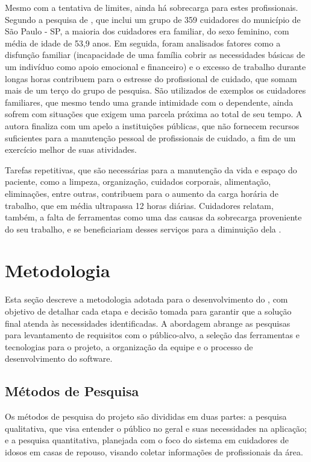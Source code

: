 \documentclass[
	article,			%
	12pt,				%
	oneside,			%
	a4paper,			%
    BIBLATEX,           %
	english,			%
	brazil,				%
	sumario=tradicional
	]{abntex2}
\begin{document}
Mesmo com a tentativa de limites, ainda há sobrecarga para estes profissionais. Segundo a pesquisa de , que inclui um grupo de 359 cuidadores do município de São Paulo - SP, a maioria dos cuidadores era familiar, do sexo feminino, com média de idade de 53,9 anos. Em seguida, foram analisados fatores como a disfunção familiar (incapacidade de uma família cobrir as necessidades básicas de um indivíduo como apoio emocional e financeiro) e o excesso de trabalho durante longas horas contribuem para o estresse do profissional de cuidado, que somam mais de um terço do grupo de pesquisa. São utilizados de exemplos os cuidadores familiares, que mesmo tendo uma grande intimidade com o dependente, ainda sofrem com situações que exigem uma parcela próxima ao total de seu tempo. A autora finaliza com um apelo a instituições públicas, que não fornecem recursos suficientes para a manutenção pessoal de profissionais de cuidado, a fim de um exercício melhor de suas atividades.

Tarefas repetitivas, que são necessárias para a manutenção da vida e espaço do paciente, como a limpeza, organização, cuidados corporais, alimentação, eliminações, entre outras, contribuem para o aumento da carga horária de trabalho, que em média ultrapassa 12 horas diárias. Cuidadores relatam, também, a falta de ferramentas como uma das causas da sobrecarga proveniente do seu trabalho, e se beneficiariam desses serviços para a diminuição dela \cite{aline2012sobrecarga}.

\section{Metodologia}

Esta seção descreve a metodologia adotada para o desenvolvimento do \nomeprojeto, com objetivo de detalhar cada etapa e decisão tomada para garantir que a solução final atenda às necessidades identificadas. A abordagem abrange as pesquisas para levantamento de requisitos com o público-alvo, a seleção das ferramentas e tecnologias para o projeto, a organização da equipe e o processo de desenvolvimento do software.

\subsection{Métodos de Pesquisa}

Os métodos de pesquisa do projeto são divididas em duas partes: a pesquisa qualitativa, que visa entender o público no geral e suas necessidades na aplicação; e a pesquisa quantitativa, planejada com o foco do sistema em cuidadores de idosos em casas de repouso, visando coletar informações de profissionais da área. 
\end{document}
